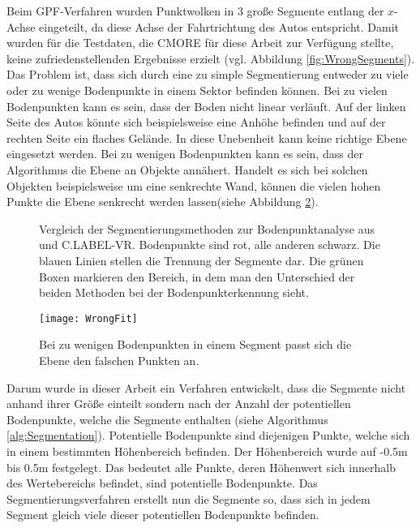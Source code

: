 Beim GPF-Verfahren wurden Punktwolken in 3 große Segmente entlang der $x$-Achse eingeteilt, da diese Achse der Fahrtrichtung des Autos entspricht. Damit wurden für die Testdaten, die CMORE für diese Arbeit zur Verfügung stellte, keine zufriedenstellenden Ergebnisse erzielt (vgl. Abbildung \ref{fig:WrongSegments}). Das Problem ist, dass sich durch eine zu simple Segmentierung entweder zu viele oder zu wenige Bodenpunkte in einem Sektor befinden können. Bei zu vielen Bodenpunkten kann es sein, dass der Boden nicht linear verläuft. Auf der linken Seite des Autos könnte sich beispielsweise eine Anhöhe befinden und auf der rechten Seite ein flaches Gelände. In diese Unebenheit kann keine richtige Ebene eingesetzt werden. Bei zu wenigen Bodenpunkten kann es sein, dass der Algorithmus die Ebene an Objekte annähert. Handelt es sich bei solchen Objekten beispielsweise um eine senkrechte Wand, können die vielen hohen Punkte die Ebene senkrecht werden lassen(siehe Abbildung \ref{fig:WrongFit}).\\

\begin{figure}%
    \centering
    \qquad
    \caption{Vergleich der Segmentierungsmethoden zur Bodenpunktanalyse aus \cite{bib:Segmentation1} und C.LABEL-VR. Bodenpunkte sind rot, alle anderen schwarz. Die blauen Linien stellen die Trennung der Segmente dar. Die grünen Boxen markieren den Bereich, in dem man den Unterschied der beiden Methoden bei der Bodenpunkterkennung sieht.}\label{fig:Segmentation}%
\end{figure}

\begin{figure}%
	\centering
    \texttt{[image: WrongFit]}
    \caption{Bei zu wenigen Bodenpunkten in einem Segment passt sich die Ebene den falschen Punkten an.}
    \label{fig:WrongFit}
\end{figure}

Darum wurde in dieser Arbeit ein Verfahren entwickelt, dass die Segmente nicht anhand ihrer Größe einteilt sondern nach der Anzahl der potentiellen Bodenpunkte, welche die Segmente enthalten (siehe Algorithmus \ref{alg:Segmentation}). Potentielle Bodenpunkte sind diejenigen Punkte, welche sich in einem bestimmten Höhenbereich befinden. Der Höhenbereich wurde auf -0.5m bis 0.5m festgelegt. Das bedeutet alle Punkte, deren Höhenwert sich innerhalb des Wertebereichs befindet, sind potentielle Bodenpunkte. Das Segmentierungsverfahren erstellt nun die Segmente so, dass sich in jedem Segment gleich viele dieser potentiellen Bodenpunkte befinden. 

